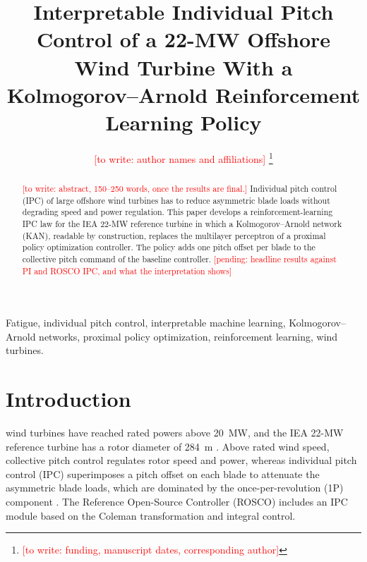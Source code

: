 \documentclass[journal]{IEEEtran}
\newcommand{\pending}[1]{\textcolor{red}{[pending: #1]}}
\newcommand{\todo}[1]{\textcolor{red}{[to write: #1]}}
\begin{document}
\title{Interpretable Individual Pitch Control of a 22-MW Offshore Wind Turbine With a
Kolmogorov--Arnold Reinforcement Learning Policy}

\author{\todo{author names and affiliations}%
\thanks{\todo{funding, manuscript dates, corresponding author}}}


\maketitle

\begin{abstract}
\todo{abstract, 150--250 words, once the results are final.} Individual pitch control (IPC) of
large offshore wind turbines has to reduce asymmetric blade loads without degrading speed and
power regulation. This paper develops a reinforcement-learning IPC law for the IEA 22-MW
reference turbine in which a Kolmogorov--Arnold network (KAN), readable by construction,
replaces the multilayer perceptron of a proximal policy optimization controller. The policy adds
one pitch offset per blade to the collective pitch command of the baseline controller.
\pending{headline results against PI and ROSCO IPC, and what the interpretation shows}
\end{abstract}

\begin{IEEEkeywords}
Fatigue, individual pitch control, interpretable machine learning, Kolmogorov--Arnold networks,
proximal policy optimization, reinforcement learning, wind turbines.
\end{IEEEkeywords}

\section{Introduction}
 wind turbines have reached rated powers above 20~MW, and the IEA
22-MW reference turbine has a rotor diameter of 284~m \cite{zahle2024iea22}. Above rated wind
speed, collective pitch control regulates rotor speed and power, whereas individual pitch control
(IPC) superimposes a pitch offset on each blade to attenuate the asymmetric blade loads, which are
dominated by the once-per-revolution (1P) component \cite{bossanyi2003ipc}. The Reference
Open-Source Controller (ROSCO) \cite{abbas2022rosco} includes an IPC module based on the Coleman
transformation and integral control.
\end{document}
